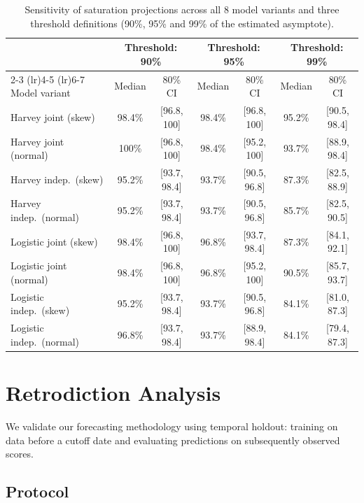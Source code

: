 \documentclass[letterpaper,twocolumn]{article}
\newcommand{\revised}[1]{#1}
\begin{document}
{\begin{table}[ht]
\centering
\begin{tabular}{lcccccc}
\toprule
 & \multicolumn{2}{c}{Threshold: 90\%} & \multicolumn{2}{c}{Threshold: 95\%} & \multicolumn{2}{c}{Threshold: 99\%} \\
\cmidrule(lr){2-3} \cmidrule(lr){4-5} \cmidrule(lr){6-7}
Model variant & Median & 80\% CI & Median & 80\% CI & Median & 80\% CI \\
\midrule
Harvey joint (skew) & 98.4\% & [96.8, 100] & 98.4\% & [96.8, 100] & 95.2\% & [90.5, 98.4] \\
Harvey joint (normal) & 100\% & [96.8, 100] & 98.4\% & [95.2, 100] & 93.7\% & [88.9, 98.4] \\
Harvey indep.\ (skew) & 95.2\% & [93.7, 98.4] & 93.7\% & [90.5, 96.8] & 87.3\% & [82.5, 88.9] \\
Harvey indep.\ (normal) & 95.2\% & [93.7, 98.4] & 93.7\% & [90.5, 96.8] & 85.7\% & [82.5, 90.5] \\
Logistic joint (skew) & 98.4\% & [96.8, 100] & 96.8\% & [93.7, 98.4] & 87.3\% & [84.1, 92.1] \\
Logistic joint (normal) & 98.4\% & [96.8, 100] & 96.8\% & [95.2, 100] & 90.5\% & [85.7, 93.7] \\
Logistic indep.\ (skew) & 95.2\% & [93.7, 98.4] & 93.7\% & [90.5, 96.8] & 84.1\% & [81.0, 87.3] \\
Logistic indep.\ (normal) & 96.8\% & [93.7, 98.4] & 93.7\% & [88.9, 98.4] & 84.1\% & [79.4, 87.3] \\
\bottomrule
\end{tabular}
\caption{Sensitivity of saturation projections across all 8 model variants and three threshold definitions (90\%, 95\% and 99\% of the estimated asymptote). }
\label{tab:sensitivity_full}
\end{table}

}%

\section{Retrodiction Analysis}
\label{app:retrodiction}

We validate our forecasting methodology using temporal holdout: training on data before a cutoff date and evaluating predictions on subsequently observed scores.

\subsection{Protocol}
\end{document}
